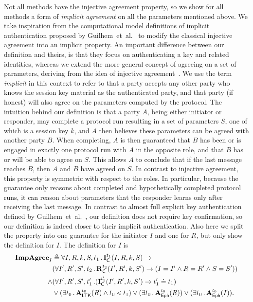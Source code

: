 Not all \mEdhoc{} methods have the injective agreement property, so we show
for all methods a form of \emph{implicit agreement} on all the parameters
mentioned above.
%
We take inspiration from the computational model definitions of implicit
authentication proposed by Guilhem~et~al.~\cite{DBLP:conf/csfw/GuilhemFW20} to
modify the classical injective agreement into an implicit property.
%
An important difference between our definition and theirs, is that they focus on
authenticating a key and related identities, whereas we extend the more general
concept of agreeing on a set of parameters, deriving from the idea of injective
agreement~\cite{DBLP:conf/csfw/Lowe97a}.
%
We use the term \emph{implicit} in this context to refer to that a party
accepts any other party who knows the session key material as the
authenticated party, and that party (if honest) will also agree on the
parameters computed by the protocol.
%
The intuition behind our definition is that a party $A$, being either initiator
or responder, may complete a protocol
run resulting in a set of parameters $S$, one of which is a session key $k$,
and $A$ then believes these parameters can be agreed with another party $B$.
%
When completing, $A$ is then guaranteed that $B$ has been or is
engaged in exactly one protocol run with $A$ in the opposite role, and that $B$
has or will be able to agree on $S$.
%
This allows $A$ to conclude that if the last message reaches $B$, then
$A$ and $B$ have agreed on $S$.
%
In contrast to injective agreement, this property is symmetric with respect to
the roles.
%
In particular, because the guarantee only reasons about completed and
hypothetically completed protocol runs, it can reason about parameters that the
responder learns only after receiving the last message.
%
In contrast to almost full explicit key authentication defined by
Guilhem~et~al.~\cite{DBLP:conf/csfw/GuilhemFW20}, our definition does not
require key confirmation, so our definition is indeed closer to their implicit
authentication.
%
Also here we split the property into one guarantee for the initiator $I$ and
one for $R$, but only show the definition for $I$.
%
The definition for $I$ is
\begin{align*}
    \mathbf{ImpAgree}_I& \triangleq
    \forall I, R, k, S, t_1\operatorname{.} \mathbf{I}_{\textsf{C}}^{t_1}(I, R, k, S)
    \rightarrow\\
      &(\forall I', R', S', t_2\operatorname{.} \mathbf{R}_{\textsf{C}}^{t_2}(I', R', k, S') \rightarrow
             (I=I' \land R=R' \land S=S'))\\
      \land &(\forall I', R', S', t_1'\operatorname{.}
        (\mathbf{I}_{\textsf{C}}^{t_1'}(I', R', k, S') \rightarrow t_1' \doteq t_1
        )\\
    &\lor(\exists t_0\operatorname{.} \mathbf{A}_{\textsf{LTK}}^{t_0}(R) \land t_0 \lessdot t_1)
    \lor(\exists t_0\operatorname{.} \mathbf{A}_{\textsf{Eph}}^{t_0}(R))
    \lor(\exists t_0\operatorname{.} \mathbf{A}_{\textsf{Eph}}^{t_0}(I)).
\end{align*}
